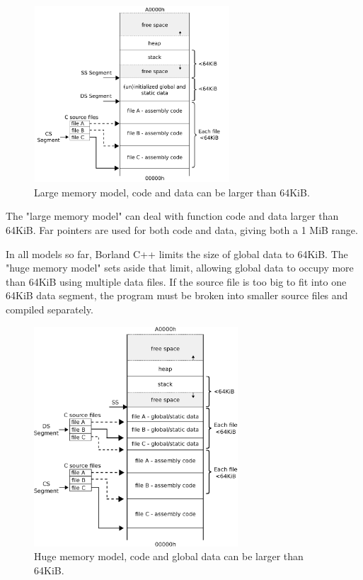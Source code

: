 \vspace{-2pt}
\begin{figure}[H]
\centering
\includegraphics[width=0.65\textwidth]{imgs/drawings/memory/large_mm_v2.eps}
\caption{Large memory model, code and data can be larger than 64KiB.}
\label{fig:mm_large}
\end{figure}



\par
The "large memory model" can deal with function code and data larger than 64KiB. Far pointers are used for both code and data, giving both a 1 MiB range.\\

\par
In all models so far, Borland C++ limits the size of global data to 64KiB. The "huge memory model" sets aside that limit, allowing global data to occupy more than 64KiB using multiple data files. If the source file is too big to fit into one 64KiB data segment, the program must be broken into smaller source files and compiled separately.\\
\begin{figure}[H]
\centering
\includegraphics[width=0.68\textwidth]{imgs/drawings/memory/huge_mm.eps}
\caption{Huge memory model, code and global data can be larger than 64KiB.}
\label{fig:mm_large}
\end{figure}

